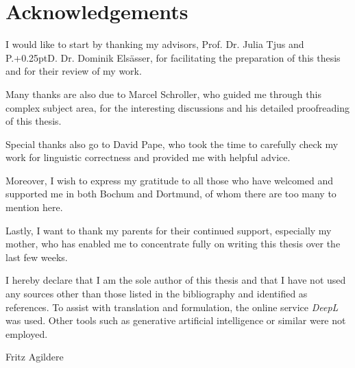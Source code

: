 \chapter*{Acknowledgements}
\label{ch:acknowledgements}

I would like to start by thanking my advisors, Prof. Dr. Julia Tjus and P{\kern-0.25pt}.{\kern+0.25pt}D. Dr. Dominik Elsässer,
for facilitating the preparation of this thesis and for their review of my work.

Many thanks are also due to Marcel Schroller, who guided me through this complex subject
area, for the interesting discussions and his detailed proofreading of this thesis.

Special thanks also go to David Pape, who took the time to carefully check my work
for linguistic correctness and provided me with helpful advice.

Moreover, I wish to express my gratitude to all those who have welcomed and supported me in
both Bochum and Dortmund, of whom there are too many to mention here.

Lastly, I want to thank my parents for their continued support, especially my mother,
who has enabled me to concentrate fully on writing this thesis over the last few weeks.

\vfill

I hereby declare that I am the sole author of this thesis and that I have not used
any sources other than those listed in the bibliography and identified as references.
To assist with translation and formulation, the online service \emph{DeepL} was used.
Other tools such as generative artificial intelligence or similar were not employed.

Fritz Agildere
